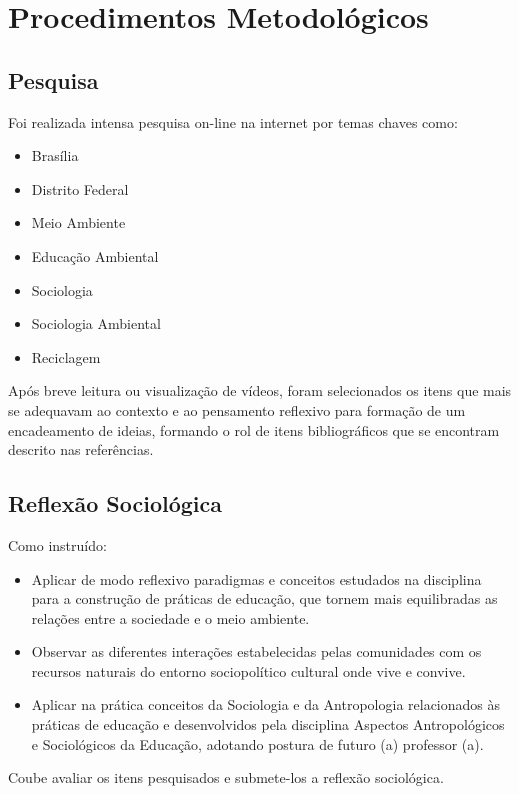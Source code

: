 \chapter{Procedimentos Metodológicos}

\section{Pesquisa}

Foi realizada intensa pesquisa on-line na internet por temas chaves como:
\begin{itemize}
    \item Brasília
    \item Distrito Federal
    \item Meio Ambiente
    \item Educação Ambiental
    \item Sociologia
    \item Sociologia Ambiental
    \item Reciclagem
\end{itemize}

Após breve leitura ou visualização de vídeos, foram selecionados os itens que mais se adequavam ao contexto e ao pensamento reflexivo para formação de um encadeamento de ideias, formando o rol de itens bibliográficos que se encontram descrito nas referências.

\section{Reflexão Sociológica}

Como instruído:
\begin{itemize}
    \item Aplicar de modo reflexivo paradigmas e conceitos estudados na disciplina para a construção de práticas de educação, que tornem mais equilibradas as relações entre a sociedade e o meio ambiente.
    \item Observar as diferentes interações estabelecidas pelas comunidades com os recursos naturais do entorno sociopolítico cultural onde vive e convive.
    \item Aplicar na prática conceitos da Sociologia e da Antropologia relacionados às práticas de educação e desenvolvidos pela disciplina Aspectos Antropológicos e Sociológicos da Educação, adotando postura de futuro (a) professor (a).
\end{itemize}

Coube avaliar os itens pesquisados e submete-los a reflexão sociológica.

